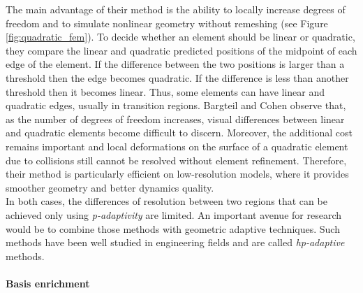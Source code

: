 The main advantage of their method is the ability to locally increase degrees of freedom and to simulate nonlinear geometry without remeshing (see Figure \ref{fig:quadratic_fem}).
To decide whether an element should be linear or quadratic, they compare the linear and quadratic predicted positions of the midpoint of each edge of the element. If the difference between the two positions is larger than a threshold then the edge becomes quadratic. If the difference is less than another threshold then it becomes linear. Thus, some elements can have linear and quadratic edges, usually in transition regions. Bargteil and Cohen observe that, as the number of degrees of freedom increases, visual differences between linear and quadratic elements become difficult to discern. Moreover, the additional cost remains important and local deformations on the surface of a quadratic element due to collisions still cannot be resolved without element refinement. Therefore, their method is particularly efficient on low-resolution models, where it provides smoother geometry and better dynamics quality.
\\
In both cases, the differences of resolution between two regions that can be achieved only using \emph{p-adaptivity} are limited. An important avenue for research would be to combine those methods with geometric adaptive techniques. Such methods have been well studied in engineering fields and are called \emph{hp-adaptive} methods.

\paragraph*{Basis enrichment}

